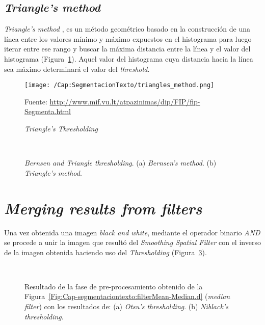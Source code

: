 \subsection{\textit{Triangle's method}}
\textit{Triangle's method} \cite{Zack:1977:AMofSCRF}, es un método geométrico 
basado en la construcción de una línea entre los valores mínimo y máximo
expuestos en el histograma para luego iterar entre ese rango y buscar la máxima
distancia entre la línea y el valor del histograma
(Figura~\ref{Fig:Cap-segmentaciontexto:triangle}). Aquel valor del histograma
cuya distancia hacia la línea sea máximo determinará el valor del
\textit{threshold}.
\begin{figure}[h]
	\centering
	\texttt{[image: /Cap:SegmentacionTexto/triangles\_method.png]}
  \caption[\textit{Triangle's Thresholding}.]{\textit{Triangle's 
  Thresholding}}\tiny{Fuente:
\url{http://www.mif.vu.lt/atpazinimas/dip/FIP/fip-Segmenta.html}}
	\label{Fig:Cap-segmentaciontexto:triangle}
\end{figure}

\begin{figure}[h]
	\centering
	\setlength{\fboxsep}{0pt}
   { }
   \\
  \caption[\textit{Bernsen and Triangle thresholding}]{\textit{Bernsen and 
  Triangle thresholding}. (a) \textit{Bernsen's method}. (b) \textit{Triangle's
method}.}
	\label{Fig:Cap-segmentaciontexto:thresholdingB}
\end{figure}

\section{\textit{Merging results from filters}}
Una vez obtenida una imagen \textit{black and white}, mediante el operador 
binario \textit{AND} se procede a unir la imagen que resultó del
\textit{Smoothing Spatial Filter} con el inverso de la imagen obtenida haciendo
uso del \textit{Thresholding}
(Figura~\ref{Fig:Cap-segmentaciontexto:resultado-preprocesing}).

\begin{figure}[h]
	\centering
   { }
   \\
  \caption[Resultado de la fase de pre-procesamiento]{Resultado de la fase de 
  pre-procesamiento obtenido de la
Figura~\ref{Fig:Cap-segmentaciontexto:filterMean-Median.d} (\textit{median
filter}) con los resultados de: (a) \textit{Otsu's thresholding}. (b)
\textit{Niblack's thresholding}.}
	\label{Fig:Cap-segmentaciontexto:resultado-preprocesing}
\end{figure}
